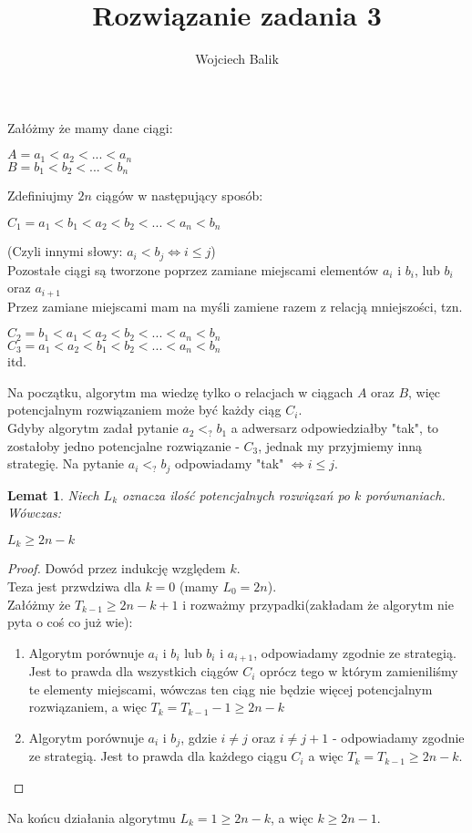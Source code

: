 \documentclass[11pt,wide]{article}
\title{Rozwiązanie zadania 3\\
}
\author{Wojciech Balik}
\newtheorem{lem}[thr]{Lemat}
\begin{document}
\maketitle     
Załóżmy że mamy dane ciągi: \\
\begin{center}
$A = a_1 < a_2 < ... < a_n$ \\
$B = b_1 < b_2 < ... < b_n$ \\
\end{center}

Zdefiniujmy $2n$ ciągów w następujący sposób: \\
\begin{center}
$C_1 = a_1 < b_1 < a_2 < b_2 < ... < a_n < b_n$
\end{center}
(Czyli innymi słowy: $a_i < b_j \iff i \leq j$) \\
Pozostałe ciągi są tworzone poprzez zamiane miejscami elementów $a_i$ i $b_i$, lub $b_i$ oraz $a_{i+1}$ \\
Przez zamiane miejscami mam na myśli zamiene razem z relacją mniejszości, tzn.
\begin{center}
$C_2 = b_1 < a_1 < a_2 < b_2 < ... < a_n < b_n$ \\
$C_3 = a_1 < a_2 < b_1 < b_2 < ... < a_n < b_n$ \\
itd.
\end{center}

Na początku, algorytm ma wiedzę tylko o relacjach w ciągach $A$ oraz $B$, więc potencjalnym rozwiązaniem może być każdy ciąg $C_i$. \\
Gdyby algorytm zadał pytanie $a_2 <_? b_1$ a adwersarz odpowiedziałby "tak", to zostałoby jedno potencjalne rozwiązanie - $C_3$, 
jednak my przyjmiemy inną strategię. Na pytanie $a_i <_? b_j$ odpowiadamy "tak" $\iff i \leq j$.

\begin{lem}
Niech $L_k$ oznacza ilość potencjalnych rozwiązań po $k$ porównaniach. Wówczas:
\begin{center}
$L_k \geq 2n - k$
\end{center}
\end{lem}
\begin{proof}
Dowód przez indukcję względem $k$. \\
Teza jest przwdziwa dla $k = 0$ (mamy $L_0 = 2n$). \\
Załóżmy że $T_{k-1} \geq 2n - k + 1$ i rozważmy przypadki(zakładam że algorytm nie pyta o coś co już wie):
\begin{enumerate}
\item 
Algorytm porównuje $a_i$ i $b_i$ lub $b_i$ i $a_{i+1}$, odpowiadamy zgodnie ze strategią. Jest to prawda dla wszystkich ciągów $C_i$ oprócz tego w którym zamieniliśmy te elementy miejscami, 
wówczas ten ciąg nie będzie więcej potencjalnym rozwiązaniem, a więc $T_k = T_{k-1}-1 \geq 2n-k$
\item 
Algorytm porównuje $a_i$ i $b_j$, gdzie $i \neq j$ oraz $i \neq j+1$ - odpowiadamy zgodnie ze strategią. Jest to prawda dla każdego ciągu $C_i$ a więc $T_k = T_{k-1} \geq 2n - k$.
\end{enumerate} 
\end{proof}
Na końcu działania algorytmu $L_k = 1 \geq 2n - k$, a więc $k \geq 2n-1$. 
\end{document}

